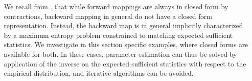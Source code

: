 
%





We recall from , that while forward mappings are always in closed form by contractions, backward mapping in general do not have a closed form representation.
Instead, the backward map is in general implicitly characterized by a maximum entropy problem constrained to matching expected sufficient statistics.
We investigate in this section specific examples, where closed forms are available for both.
In these cases, parameter estimation can thus be solved by application of the inverse on the expected sufficient statistics with respect to the empirical distribution, and iterative algorithms can be avoided.


